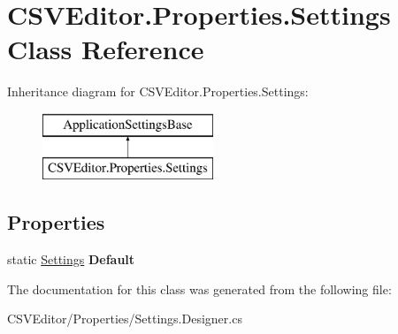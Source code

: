 \hypertarget{class_c_s_v_editor_1_1_properties_1_1_settings}{}\section{C\+S\+V\+Editor.\+Properties.\+Settings Class Reference}
\label{class_c_s_v_editor_1_1_properties_1_1_settings}
Inheritance diagram for C\+S\+V\+Editor.\+Properties.\+Settings\+:\begin{figure}[H]
\begin{center}
\leavevmode
\includegraphics[height=2.000000cm]{class_c_s_v_editor_1_1_properties_1_1_settings}
\end{center}
\end{figure}
\subsection*{Properties}
\begin{DoxyCompactItemize}
\item 
\mbox{\label{class_c_s_v_editor_1_1_properties_1_1_settings_a166e73c810aad38956878eb8a6479d01}} 
static \mbox{\hyperlink{class_c_s_v_editor_1_1_properties_1_1_settings}{Settings}} {\bfseries Default}
\end{DoxyCompactItemize}


The documentation for this class was generated from the following file\+:\begin{DoxyCompactItemize}
\item 
C\+S\+V\+Editor/\+Properties/Settings.\+Designer.\+cs\end{DoxyCompactItemize}
